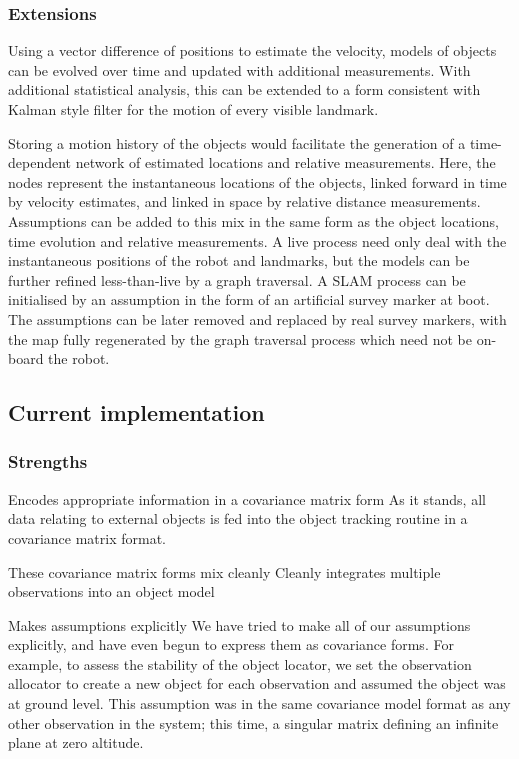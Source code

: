 \documentclass[a4paper, 11pt, titlepage]{article}
\begin{document}
    \subsubsection{Extensions}
      Using a vector difference of positions to estimate the velocity, models of objects can be evolved over time and updated with additional measurements.  With additional statistical analysis, this can be extended to a form consistent with Kalman style filter for the motion of every visible landmark.

      Storing a motion history of the objects would facilitate the generation of a time-dependent network of estimated locations and relative measurements.
      Here, the nodes represent the instantaneous locations of the objects, linked forward in time by velocity estimates, and linked in space by relative distance measurements.  Assumptions can be added to this mix in the same form as the object locations, time evolution and relative measurements.  A live process need only deal with the instantaneous positions of the robot and landmarks, but the models can be further refined less-than-live by a graph traversal.
      A SLAM process can be initialised by an assumption in the form of an artificial survey marker at boot. The assumptions can be later removed and replaced by real survey markers, with the map fully regenerated by the graph traversal process which need not be on-board the robot.
      

  \subsection{Current implementation}
    \subsubsection{Strengths}
      
      Encodes appropriate information in a covariance matrix form
      As it stands, all data relating to external objects is fed into the object tracking routine in a covariance matrix format.  

      These covariance matrix forms mix cleanly 
      Cleanly integrates multiple observations into an object model

      Makes assumptions explicitly
      We have tried to make all of our assumptions explicitly, and have even begun to express them as covariance forms.
      For example, to assess the stability of the object locator, we set the observation allocator to create a new object for each observation and assumed the object was at ground level.  This assumption was in the same covariance model format as any other observation in the system; this time, a singular matrix defining an infinite plane at zero altitude.
\end{document}
